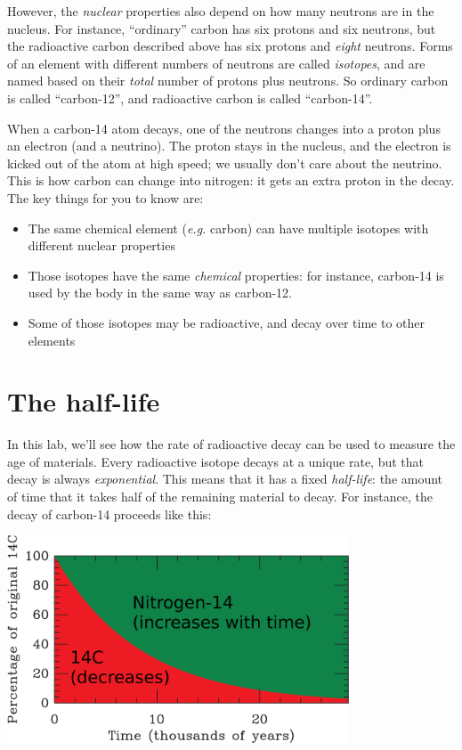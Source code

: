 \documentclass[11pt]{article}
\begin{document}
However, the {\it nuclear} properties also depend on how many neutrons are in the nucleus. For instance, ``ordinary'' carbon has six protons and six neutrons, but the radioactive carbon described above has six protons and {\it eight} neutrons. 
Forms of an element with different numbers of neutrons are called {\it isotopes}, and are named based on their {\it total} number of protons plus neutrons. So ordinary carbon is called ``carbon-12'', and radioactive carbon is called ``carbon-14''.

When a carbon-14 atom decays, one of the neutrons changes into a proton plus an electron (and a neutrino). The proton stays in the nucleus, and the electron is kicked out of the atom at high speed; we usually don't care about the neutrino. This is how 
carbon can change into nitrogen: it gets an extra proton in the decay.
\newpage
The key things for you to know are:

\begin{itemize}
\item The same chemical element ({\it e.g.} carbon) can have multiple isotopes with different nuclear properties
\item Those isotopes have the same {\it chemical} properties: for instance, carbon-14 is used by the body in the same way
as carbon-12.
\item Some of those isotopes may be radioactive, and decay over time to other elements
\end{itemize}

\section{The half-life}

In this lab, we'll see how the rate of radioactive decay can be used to measure the age of materials.
Every radioactive isotope decays at a unique rate, but that decay is always {\it exponential}. This means that it has a fixed
{\it half-life}: the amount of time that it takes half of the remaining material to decay. For instance, the decay of carbon-14
proceeds like this:

\begin{center}
\includegraphics[width=4in]{carbon-fraction-crop.png}
\end{center}
\end{document}
